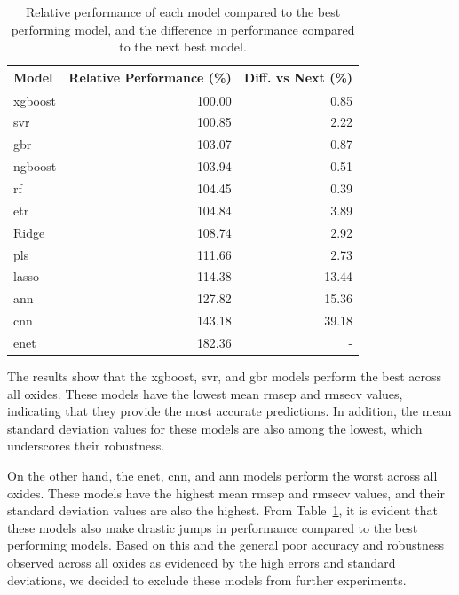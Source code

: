 \begin{table}[ht]
\centering
\begin{tabularx}{\linewidth}{lrr}
\toprule
Model & Relative Performance (\%) & Diff. vs Next (\%) \\
\midrule
\gls{xgboost} & 100.00 & 0.85 \\
\gls{svr} & 100.85 & 2.22 \\
\gls{gbr} & 103.07 & 0.87 \\
\gls{ngboost} & 103.94 & 0.51 \\
\gls{rf} & 104.45 & 0.39 \\
\gls{etr} & 104.84 & 3.89 \\
Ridge & 108.74 & 2.92 \\
\gls{pls} & 111.66 & 2.73 \\
\gls{lasso} & 114.38 & 13.44 \\
\gls{ann} & 127.82 & 15.36 \\
\gls{cnn} & 143.18 & 39.18 \\
\gls{enet} & 182.36 & - \\
\bottomrule
\end{tabularx}
\caption{Relative performance of each model compared to the best performing model, and the difference in performance compared to the next best model.}
\label{tab:relative_performance}
\end{table}

The results show that the \gls{xgboost}, \gls{svr}, and \gls{gbr} models perform the best across all oxides.
These models have the lowest mean \gls{rmsep} and \gls{rmsecv} values, indicating that they provide the most accurate predictions.
In addition, the mean standard deviation values for these models are also among the lowest, which underscores their robustness.

On the other hand, the \gls{enet}, \gls{cnn}, and \gls{ann} models perform the worst across all oxides.
These models have the highest mean \gls{rmsep} and \gls{rmsecv} values, and their standard deviation values are also the highest.
From Table~\ref{tab:relative_performance}, it is evident that these models also make drastic jumps in performance compared to the best performing models.
Based on this and the general poor accuracy and robustness observed across all oxides as evidenced by the high errors and standard deviations, we decided to exclude these models from further experiments.

